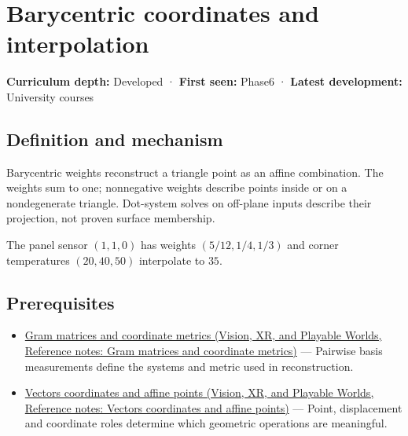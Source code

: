\hypertarget{appendix-02b9d9a81dca}{}\label{referencestart:appendix-02b9d9a81dca}
\section{Barycentric coordinates and interpolation}\label{appendix-02b9d9a81dca-barycentric-coordinates-and-interpolation}

\textbf{Curriculum depth:} Developed · \textbf{First seen:} Phase6 · \textbf{Latest development:} University courses

\begin{allmightroledefinition}

\subsection{Definition and mechanism}\label{appendix-02b9d9a81dca-definition-and-mechanism}

Barycentric weights reconstruct a triangle point as an affine combination. The weights sum to one; nonnegative weights describe points inside or on a nondegenerate triangle. Dot-system solves on off-plane inputs describe their projection, not proven surface membership.

\end{allmightroledefinition}

The panel sensor \((1,1,0)\) has weights \((5/12,1/4,1/3)\) and corner temperatures \((20,40,50)\) interpolate to \(35\).

\subsection{Prerequisites}\label{appendix-02b9d9a81dca-prerequisites}

\begin{itemize}
\tightlist
\item
  \href{../07-Vision-XR-and-Playable-Worlds/main.pdf\#nameddest=appendix-3b863809f82a}{Gram matrices and coordinate metrics (Vision, XR, and Playable Worlds, Reference notes: Gram matrices and coordinate metrics)} --- Pairwise basis measurements define the systems and metric used in reconstruction.
\item
  \href{../07-Vision-XR-and-Playable-Worlds/main.pdf\#nameddest=appendix-0659864c0aa3}{Vectors coordinates and affine points (Vision, XR, and Playable Worlds, Reference notes: Vectors coordinates and affine points)} --- Point, displacement and coordinate roles determine which geometric operations are meaningful.
\end{itemize}

